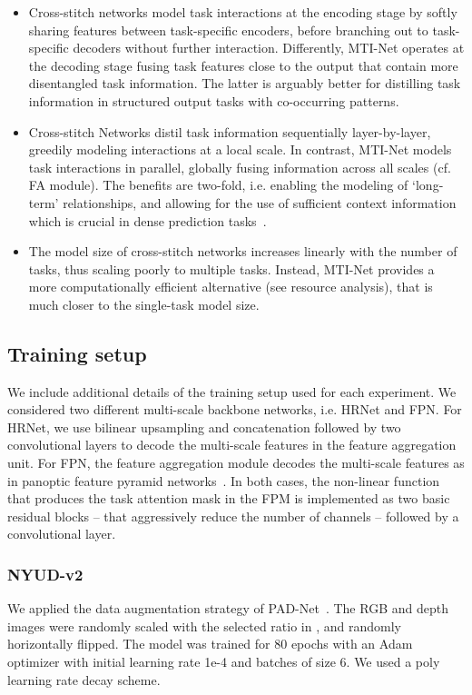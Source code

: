 \documentclass[runningheads]{llncs}
\begin{document}
\begin{itemize}
\item Cross-stitch networks model task interactions at the encoding stage by softly sharing features between task-specific encoders, before branching out to task-specific decoders without further interaction. Differently, MTI-Net operates at the decoding stage fusing task features close to the output that contain more disentangled task information. The latter is arguably better for distilling task information in structured output tasks with co-occurring patterns.

\item Cross-stitch Networks distil task information sequentially layer-by-layer, greedily modeling interactions at a local scale. In contrast, MTI-Net models task interactions in parallel, globally fusing information across all scales (cf. FA module). The benefits are two-fold, i.e. enabling the modeling of ‘long-term’ relationships, and allowing for the use of sufficient context information which is crucial in dense prediction tasks~\cite{chen2018encoder}.

\item The model size of cross-stitch networks  increases linearly with the number of tasks, thus scaling poorly to multiple tasks. Instead, MTI-Net provides a more computationally efficient alternative (see resource analysis), that is much closer to the single-task model size.
\end{itemize}


\subsection{Training setup}
We include additional details of the training setup used for each experiment. We considered two different multi-scale backbone networks, i.e. HRNet and FPN. For HRNet, we use bilinear upsampling and concatenation followed by two convolutional layers to decode the multi-scale features in the feature aggregation unit. For FPN, the feature aggregation module decodes the multi-scale features as in panoptic feature pyramid networks~\cite{kirillov2019panoptic}. In both cases, the non-linear function that produces the task attention mask in the FPM is implemented as two basic residual blocks -- that aggressively reduce the number of channels -- followed by a  convolutional layer. 

\subsubsection{NYUD-v2}
We applied the data augmentation strategy of PAD-Net~\cite{xu2018pad}. The RGB and depth images were randomly scaled with the selected ratio in , and randomly horizontally flipped. The model was trained for 80 epochs with an Adam optimizer with initial learning rate 1e-4 and batches of size 6. We used a poly learning rate decay scheme.
\end{document}
